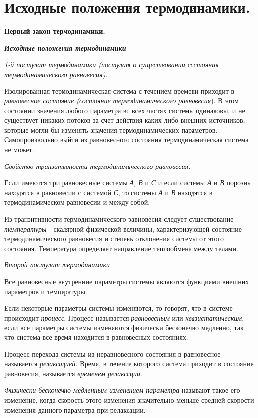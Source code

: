\chapter{Исходные положения термодинамики.}

\textbf{Первый закон термодинамики.}

\emph{\textbf{Исходные положения термодинамики}}

\emph{1-й постулат термодинамики (постулат о существовании состояния
термодинамического равновесия).}

Изолированная термодинамическая система с течением времени приходит в
\emph{равновесное состояние (состояние термодинамического равновесия}).
В этом состоянии значения любого параметра во всех частях системы
одинаковы, и не существует никаких потоков за счет действия каких-либо
внешних источников, которые могли бы изменять значения термодинамических
параметров. Самопроизвольно выйти из равновесного состояния
термодинамическая система не может.

\emph{Свойство транзитивности термодинамического равновесия.}

Если имеются три равновесные системы \emph{А, В} и \emph{С} и если
системы \emph{А} и \emph{В} порознь находятся в равновесии с системой
\emph{С}, то системы \emph{А} и \emph{В} находятся в термодинамическом
равновесии и между собой.

Из транзитивности термодинамического равновесия следует существование
\emph{температуры} - скалярной физической величины, характеризующей
состояние термодинамического равновесия и степень отклонения системы от
этого состояния. Температура определяет направление теплообмена между
телами.

\emph{Второй постулат термодинамики.}

Все равновесные внутренние параметры системы являются функциями внешних
параметров и температуры.

Если некоторые параметры системы изменяются, то говорят, что в системе
происходит \emph{процесс}. Процесс называется \emph{равновесным} или
\emph{квазистатическим}, если все параметры системы изменяются физически
бесконечно медленно, так что система все время находится в равновесных
состояниях.

Процесс перехода системы из неравновесного состояния в равновесное
называется \emph{релаксацией.} Время, в течение которого система
приходит в состояние равновесия, называется \emph{временем релаксации}.

\emph{Физически бесконечно медленным изменением параметра} называют
такое его изменение, когда скорость этого изменения значительно меньше
средней скорости изменения данного параметра при релаксации.


